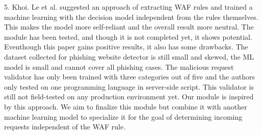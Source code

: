5.	Khoi. Le et al. \cite{Khoi} suggested an approach of extracting WAF rules and trained a machine learning with the decision model independent from the rules themselves. This makes the model more self-reliant and the overall result more neutral. The module has been tested, and though it is not completed yet, it shows potential. Eventhough this paper gains positive results, it also has some drawbacks. The dataset collected for phishing website detector is still small and skewed, the ML model is small and cannot cover all phishing cases. The malicious request validator has only been trained with three categories out of five and the authors only tested on one programming language in server-side script. This validator is still not field-tested on any production environment yet. Our module is inspired by this approach. We aim to finalize this module but combine it with another machine learning model to specialize it for the goal of determining incoming requests independent of the WAF rule.

